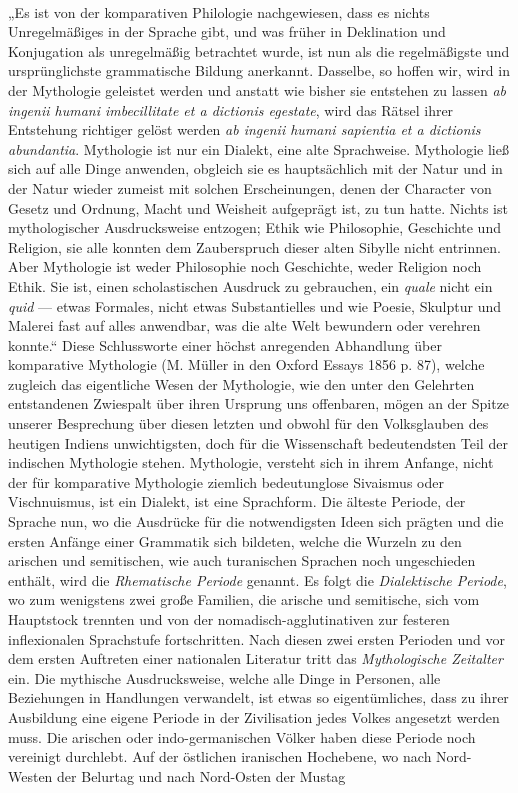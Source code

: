 \documentclass{article}
\begin{document}
\paragraph{}
„Es ist von der komparativen Philologie nachgewiesen, dass es nichts Unregelmäßiges in der Sprache gibt, und was früher in Deklination und Konjugation als unregelmäßig betrachtet wurde, ist nun als die regelmäßigste und ursprünglichste grammatische Bildung anerkannt. Dasselbe, so hoffen wir, wird in der Mythologie geleistet werden und anstatt wie bisher sie entstehen zu lassen \emph{ab ingenii humani imbecillitate et a dictionis egestate}, wird das Rätsel ihrer Entstehung richtiger gelöst werden \emph{ab ingenii humani sapientia et a dictionis abundantia}. Mythologie ist nur ein Dialekt, eine alte Sprachweise. Mythologie ließ sich auf alle Dinge anwenden, obgleich sie es hauptsächlich mit der Natur und in der Natur wieder zumeist mit solchen Erscheinungen, denen der Character von Gesetz und Ordnung, Macht und Weisheit aufgeprägt ist, zu tun hatte. Nichts ist mythologischer Ausdrucksweise entzogen; Ethik wie Philosophie, Geschichte und Religion, sie alle konnten dem Zauberspruch dieser alten Sibylle nicht entrinnen. Aber Mythologie ist weder Philosophie noch Geschichte, weder Religion noch Ethik. Sie ist, einen scholastischen Ausdruck zu gebrauchen, ein \emph{quale} nicht ein \emph{quid} — etwas Formales, nicht etwas Substantielles und wie Poesie, Skulptur und Malerei fast auf alles anwendbar, was die alte Welt bewundern oder verehren konnte.“ Diese Schlussworte einer höchst anregenden Abhandlung über komparative Mythologie (M. Müller in den Oxford Essays 1856 p. 87), welche zugleich das eigentliche Wesen der Mythologie, wie den unter den Gelehrten entstandenen Zwiespalt über ihren Ursprung uns offenbaren, mögen an der Spitze unserer Besprechung über diesen letzten und obwohl für den Volksglauben des heutigen Indiens unwichtigsten, doch für die Wissenschaft bedeutendsten Teil der indischen Mythologie stehen. Mythologie, versteht sich in ihrem Anfange, nicht der für komparative Mythologie ziemlich bedeutunglose Sivaismus oder Vischnuismus, ist ein Dialekt, ist eine Sprachform. Die älteste Periode, der Sprache nun, wo die Ausdrücke für die notwendigsten Ideen sich prägten und die ersten Anfänge einer Grammatik sich bildeten, welche die Wurzeln zu den arischen und semitischen, wie auch turanischen Sprachen noch ungeschieden enthält, wird die \emph{Rhematische Periode} genannt. Es folgt die \emph{Dialektische Periode}, wo zum wenigstens zwei große Familien, die arische und semitische, sich vom Hauptstock trennten und von der nomadisch-agglutinativen zur festeren inflexionalen Sprachstufe fortschritten. Nach diesen zwei ersten Perioden und vor dem ersten Auftreten einer nationalen Literatur tritt das \emph{Mythologische Zeitalter} ein. Die mythische Ausdrucksweise, welche alle Dinge in Personen, alle Beziehungen in Handlungen verwandelt, ist etwas so eigentümliches, dass zu ihrer Ausbildung eine eigene Periode in der Zivilisation jedes Volkes angesetzt werden muss. Die arischen oder indo-germanischen Völker haben diese Periode noch vereinigt durchlebt. Auf der östlichen iranischen Hochebene, wo nach Nord-Westen der Belurtag und nach Nord-Osten der Mustag 
\end{document}
